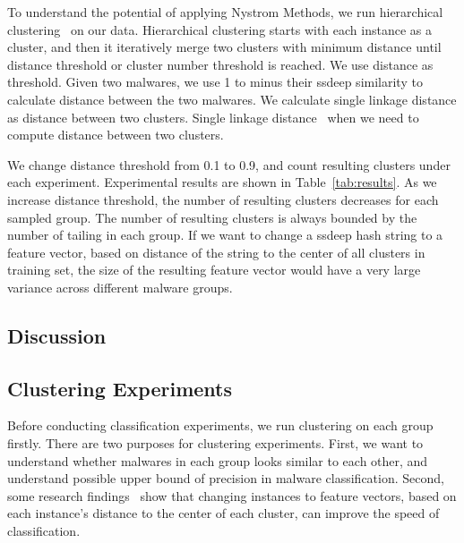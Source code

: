 To understand the potential of applying Nystrom Methods, we run hierarchical clustering~\cite{hcluster} on our data.
Hierarchical clustering starts with each instance as a cluster, 
and then it iteratively merge two clusters with minimum distance 
until distance threshold or cluster number threshold is reached. 
We use distance as threshold. 
Given two malwares, 
we use 1 to minus their ssdeep similarity to calculate distance between the two malwares. 
We calculate single linkage distance as distance between two clusters. 
Single linkage
distance~\cite{single-link} when we need to compute distance between two clusters. 

We change distance threshold from 0.1 to 0.9, 
and count resulting clusters under each experiment. 
Experimental results are shown in Table~\ref{tab:results}. 
As we increase distance threshold, the number of resulting clusters decreases for each sampled group. 
The number of resulting clusters is always bounded by the number of tailing in each group. 
If we want to change a ssdeep hash string to a feature vector, 
based on distance of the string to the center of all clusters in training set, 
the size of the resulting feature vector would have a very large variance across different malware groups. 





\subsection{Discussion}



\subsection{Clustering Experiments}


Before conducting classification experiments, 
we run clustering on each group firstly. 
There are two purposes for clustering experiments.
First, we want to understand whether malwares in each group looks similar to each other, 
and understand possible upper bound of precision in malware classification.
Second, some research findings~\cite{clustering-purpose} show that changing instances to feature vectors, 
based on each instance’s distance to the center of each cluster, 
can improve the speed of classification.  


